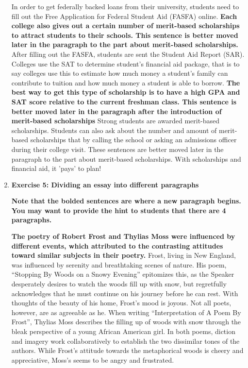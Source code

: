 \begin{enumerate}
In order to get federally backed loans from their university, students need to fill out the Free Application for Federal Student Aid (FASFA) online.\textbf{ Each college also gives out a certain number of merit-based scholarships to attract students to their schools. This sentence is better moved later in the paragraph to the part about merit-based scholarships.} After filling out the FASFA, students are sent the Student Aid Report (SAR).  Colleges use the SAT to determine student's financial aid package, that is to say colleges use this to estimate how much money a student's family can contribute to tuition and how much money a student is able to borrow. \textbf{The best way to get this type of scholarship is to have a high GPA and SAT score relative to the current freshman class. This sentence is better moved later in the paragraph after the introduction of merit-based scholarships} Strong students are awarded merit-based scholarships. Students can also ask about the number and amount of merit-based scholarships that by calling the school or asking an admissions officer during their college visit.  These sentences are better moved later in the paragraph to the part about merit-based scholarships. With scholarships and financial aid, it 'pays' to plan!

\item \textbf{Exercise 5: Dividing an essay into different paragraphs}

\textbf{Note that the bolded sentences are where a new paragraph begins. You may want to provide the hint to students that there are 4 paragraphs.}

\textbf{The poetry of Robert Frost and Thylias Moss were influenced by different events, which attributed to the contrasting attitudes toward similar subjects in their poetry.}  Frost, living in New England, was influenced by serenity and breathtaking scenes of nature. His poem, “Stopping By Woods on a Snowy Evening” epitomizes this, as the Speaker desperately desires to watch the woods fill up with snow, but regretfully acknowledges that he must continue on his journey before he can rest. With thoughts of the beauty of his home, Frost's mood is joyous. Not all poets, however, are as agreeable as he. When writing “Interpretation of A Poem By Frost”, Thylias Moss describes the filling up of woods with snow through the bleak perspective of a young African American girl. In both poems, diction and imagery work collaboratively to establish the two dissimilar tones of the authors. While Frost's attitude towards the metaphorical woods is cheery and appreciative, Moss's seems to be angry and frustrated. 


\end{enumerate}
